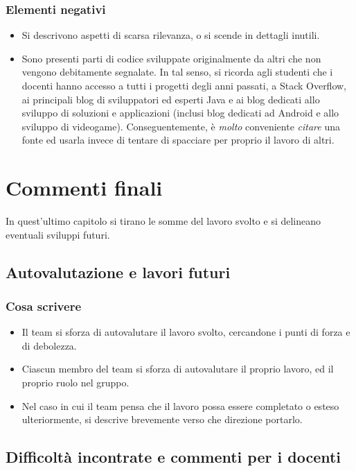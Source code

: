 \documentclass[a4paper,12pt]{report}
\begin{document}
\subsection*{Elementi negativi}
\begin{itemize}
 \item Si descrivono aspetti di scarsa rilevanza, o si scende in dettagli inutili.
 \item Sono presenti parti di codice sviluppate originalmente da altri che non vengono debitamente segnalate. In tal senso, si ricorda agli studenti che i docenti hanno accesso a tutti i progetti degli anni passati, a Stack Overflow, ai principali blog di sviluppatori ed esperti Java e ai blog dedicati allo sviluppo di soluzioni e applicazioni (inclusi blog dedicati ad Android e allo sviluppo di videogame). Conseguentemente, è \emph{molto} conveniente \emph{citare} una fonte ed usarla invece di tentare di spacciare per proprio il lavoro di altri.
\end{itemize}

\chapter{Commenti finali}

In quest'ultimo capitolo si tirano le somme del lavoro svolto e si delineano eventuali sviluppi futuri.

\section{Autovalutazione e lavori futuri}

\subsection*{Cosa scrivere}

\begin{itemize}
 \item Il team si sforza di autovalutare il lavoro svolto, cercandone i punti di forza e di debolezza.
 \item Ciascun membro del team si sforza di autovalutare il proprio lavoro, ed il proprio ruolo nel gruppo.
 \item Nel caso in cui il team pensa che il lavoro possa essere completato o esteso ulteriormente, si descrive brevemente verso che direzione portarlo.
\end{itemize}

\section{Difficoltà incontrate e commenti per i docenti}
\end{document}
